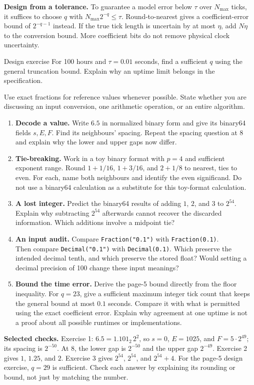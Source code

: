 \textbf{Design from a tolerance.} To guarantee a model error below $\tau$ over
$N_{\max}$ ticks, it suffices to choose $q$ with $N_{\max}2^{-q}\le\tau$.
Round-to-nearest gives a coefficient-error bound of $2^{-q-1}$ instead.
If the true tick length is uncertain by at most $\eta$, add $N\eta$ to the
conversion bound. More coefficient bits do not remove physical clock uncertainty.
\begin{question}{Design exercise}
For 100 hours and $\tau=0.01$ seconds, find a sufficient $q$ using the general
truncation bound. Explain why an uptime limit belongs in the specification.
\end{question}

\newpage
{}
Use exact fractions for reference values whenever possible. State whether you are
discussing an input conversion, one arithmetic operation, or an entire algorithm.
\begin{enumerate}
\item \textbf{Decode a value.} Write $6.5$ in normalized binary form and give its
binary64 fields $s,E,F$. Find its neighbours' spacing. Repeat the spacing question
at $8$ and explain why the lower and upper gaps now differ.
\item \textbf{Tie-breaking.} Work in a toy binary format with $p=4$ and sufficient
exponent range. Round $1+1/16$, $1+3/16$, and $2+1/8$ to nearest, ties to even.
For each, name both neighbours and identify the even significand. Do not use a
binary64 calculation as a substitute for this toy-format calculation.
\item \textbf{A lost integer.} Predict the binary64 results of adding $1$, $2$,
and $3$ to $2^{54}$. Explain why subtracting $2^{54}$ afterwards cannot recover
the discarded information. Which additions involve a midpoint tie?
\item \textbf{An input audit.} Compare \texttt{Fraction("0.1")} with
\texttt{Fraction(0.1)}.\\ Then compare \texttt{Decimal("0.1")} with
\texttt{Decimal(0.1)}.
Which preserve the intended decimal tenth, and which preserve the stored float?
Would setting a decimal precision of 100 change these input meanings?
\item \textbf{Bound the time error.} Derive the page-5 bound directly from the
floor inequality. For $q=23$, give a sufficient maximum integer tick count that
keeps the general bound at most $0.1$ seconds. Compare it with what is permitted
using the exact coefficient error. Explain why agreement at one uptime is not
a proof about all possible runtimes or implementations.
\end{enumerate}
\textbf{Selected checks.}
Exercise 1: $6.5=1.101_2\,2^2$, so $s=0$, $E=1025$, and $F=5\cdot2^{49}$;
its spacing is $2^{-50}$. At $8$, the lower gap is $2^{-50}$ and the upper gap
$2^{-49}$. Exercise 2 gives $1$, $1.25$, and $2$. Exercise 3 gives
$2^{54}$, $2^{54}$, and $2^{54}+4$. For the page-5 design exercise, $q=29$
is sufficient. Check each answer by explaining its rounding or bound, not just
by matching the number.

